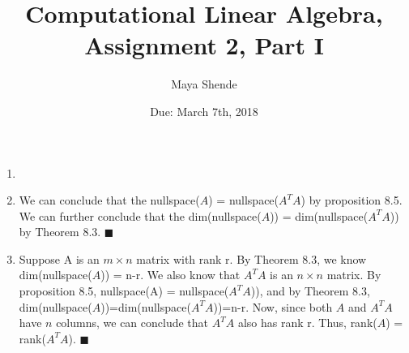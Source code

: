 \documentclass{article}
\title{Computational Linear Algebra, Assignment 2, Part I}
\author{Maya Shende}
\date{Due: March 7th, 2018}
\newcommand*{\qed}{\hfill\ensuremath{\blacksquare}}
\begin{document}
\maketitle

\begin{enumerate}

\item 
	\item We can conclude that the nullspace($A$) = nullspace($A^TA$) by proposition 8.5. We can further conclude that the dim(nullspace($A$)) = dim(nullspace($A^TA$)) by Theorem 8.3. \qed
	
	\item Suppose A is an $m \times n$ matrix with rank r. By Theorem 8.3, we know dim(nullspace($A$)) = n-r. We also know that $A^TA$ is an $n \times n$ matrix. By proposition 8.5, nullspace(A) = nullspace($A^TA$)), and by Theorem 8.3, dim(nullspace($A$))=dim(nullspace($A^TA$))=n-r. Now, since both $A$ and $A^TA$ have $n$ columns, we can conclude that $A^TA$ also has rank r. Thus, rank($A$) = rank($A^TA$). \qed

\end{enumerate}
\end{document}
